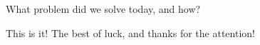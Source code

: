 \documentclass{beamer}
\begin{document}


\begin{slide}{
\item What problem did we solve today, and how?
}\end{slide}

\begin{frame}{This is it!}
\center
\fontsize{18pt}{7.2}\selectfont
The best of luck, and thanks for the attention!
\end{frame}
\end{document}
